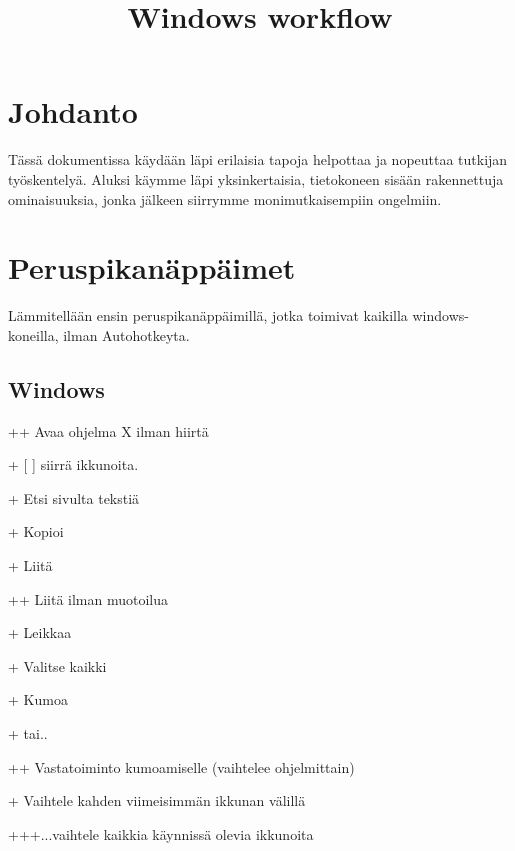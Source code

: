 \documentclass[a4paper,12pt]{scrartcl}
\title{Windows workflow}
\begin{document}
\maketitle

\tableofcontents

\newpage

\section{Johdanto}\label{Johdanto}
Tässä dokumentissa käydään läpi erilaisia tapoja helpottaa ja nopeuttaa tutkijan työskentelyä. Aluksi käymme läpi yksinkertaisia, tietokoneen sisään rakennettuja ominaisuuksia, jonka jälkeen siirrymme monimutkaisempiin ongelmiin.

\section{Peruspikanäppäimet}
\label{perus}

Lämmitellään ensin peruspikanäppäimillä, jotka toimivat kaikilla windows-koneilla, ilman Autohotkeyta.

\subsection{Windows}

++\keys{\return} Avaa ohjelma X ilman hiirtä

+ [ \keys{\arrowkeyleft} \keys{\arrowkeyright} \keys{\arrowkeyup} \keys{\arrowkeydown} ] siirrä ikkunoita. 

+ Etsi sivulta tekstiä


+ Kopioi 

+ Liitä 

+\keys{\shift}+ Liitä ilman muotoilua

+ Leikkaa 

+ Valitse kaikki

+ Kumoa

+ tai..

++  Vastatoiminto kumoamiselle (vaihtelee ohjelmittain)

+ Vaihtele kahden viimeisimmän ikkunan välillä

+++...vaihtele kaikkia käynnissä olevia ikkunoita
\end{document}
